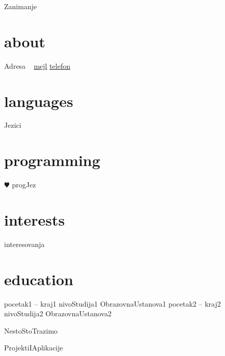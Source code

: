 \documentclass[]{friggeri-cv}
\begin{document}
       {Zanimanje}


\begin{aside}
  \section{about}
    Adresa
    ~
    \href{mailto:mejl}{mejl}
    \href{telefon}{telefon}
  \section{languages}
    Jezici
  \section{programming}
    {\color{red} $\varheartsuit$} progJez
\end{aside}

\section{interests}

interesovanja

\section{education}

\begin{entrylist}
  \entry
    {pocetak1 – kraj1}
    {nivoStudija1}
    {}
    {ObrazovnaUstanova1}
  \entry
    {pocetak2 – kraj2}
    {nivoStudija2}
    {}
    {ObrazovnaUstanova2}
  \end{entrylist}


NestoStoTrazimo


ProjektiIAplikacije
\end{document}
